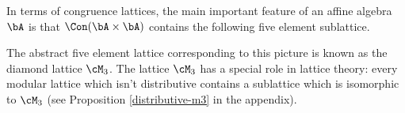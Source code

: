 In terms of congruence lattices, the main important feature of an affine algebra $\bA$ is that $\Con(\bA\times\bA)$ contains the following five element sublattice.%
\begin{center}
\end{center}
The abstract five element lattice corresponding to this picture is known as the diamond lattice $\cM_3$. The lattice $\cM_3$ has a special role in lattice theory: every modular lattice which isn't distributive contains a sublattice which is isomorphic to $\cM_3$ (see Proposition \ref{distributive-m3} in the appendix).

